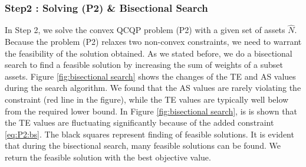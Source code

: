\documentclass[11pt]{article}
\begin{document}

%	
%
%		
%		
	

\subsubsection{Step2 : Solving (P2) \& Bisectional Search }

	In Step 2, we solve the convex QCQP problem (P2) with a given set of assets $\hat{N}$. Because the problem (P2) relaxes two non-convex constraints, we need to warrant the feasibility of the solution obtained. As we stated before, we do a bisectional search to find a feasible solution by increasing the sum of weights of a subset assets. Figure \ref{fig:bisectional search} shows the changes of the TE and AS values during the search algorithm. We found that the AS values are rarely violating the constraint (red line in the figure), while the TE values are typically well below from the required lower bound. In Figure \ref{fig:bisectional search}, is is shown that the TE values are fluctuating significantly because of the added constraint \eqref{eq:P2:bs}. The black squares represent finding of feasible solutions. It is evident that during the bisectional search, many feasible solutions can be found. We return the feasible solution with the best objective value.
	
\end{document}
